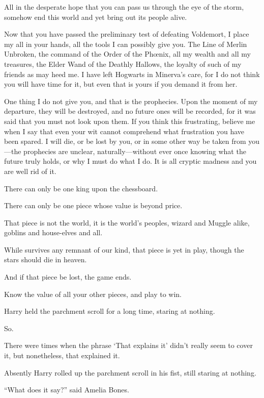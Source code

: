 \begin{writtenNote}
All in the desperate hope that you can pass us through the eye of the storm, somehow end this world and yet bring out its people alive.

Now that you have passed the preliminary test of defeating Voldemort, I place my all in your hands, all the tools I can possibly give you. The Line of Merlin Unbroken, the command of the Order of the Phœnix, all my wealth and all my treasures, the Elder Wand of the Deathly Hallows, the loyalty of such of my friends as may heed me. I have left Hogwarts in Minerva’s care, for I do not think you will have time for it, but even that is yours if you demand it from her.

One thing I do not give you, and that is the prophecies. Upon the moment of my departure, they will be destroyed, and no future ones will be recorded, for it was said that you must not look upon them. If you think this frustrating, believe me when I say that even your wit cannot comprehend what frustration you have been spared. I will die, or be lost by you, or in some other way be taken from you—the prophecies are unclear, naturally—without ever once knowing what the future truly holds, or why I must do what I do. It is all cryptic madness and you are well rid of it.

There can only be one king upon the chessboard.

There can only be one piece whose value is beyond price.

That piece is not the world, it is the world’s peoples, wizard and Muggle alike, goblins and house-elves and all.

While survives any remnant of our kind, that piece is yet in play, though the stars should die in heaven.

And if that piece be lost, the game ends.

Know the value of all your other pieces, and play to win.

\end{writtenNote}

\later

Harry held the parchment scroll for a long time, staring at nothing.

So.

There were times when the phrase ‘That explains it’ didn’t really seem to cover it, but nonetheless, that explained it.

Absently Harry rolled up the parchment scroll in his fist, still staring at nothing.

“What does it say?” said Amelia Bones.


